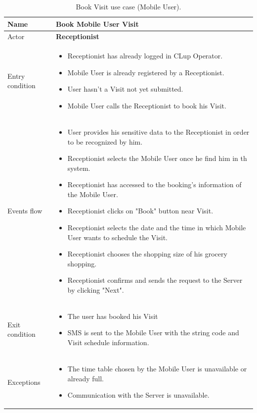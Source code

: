 \begin{table}[H]\begin{tabular}{|p{5cm} | p{7cm} | }
	\hline
	Name & \textbf{Book Mobile User Visit}  \\
	\hline
	Actor & \textbf{Receptionist} \\
	\hline
	Entry condition &
	\begin{itemize}
		\item Receptionist has already logged in CLup Operator. 
 		\item Mobile User is already registered by a Receptionist.
		\item User hasn't a Visit not yet submitted. 
        \item Mobile User calls the Receptionist to book his Visit.
	\end{itemize} \\
	\hline
	Events flow & 
	\begin{itemize}
		\item User provides his sensitive data to the Receptionist in order to be recognized by him. 
        \item Receptionist selects the Mobile User once he find him in th system.
		\item Receptionist has accessed to the booking's information of the Mobile User.
        \item Receptionist clicks on "Book" button near Visit.
		\item Receptionist selects the date and the time in which Mobile User wants to schedule the Visit.
		\item Receptionist chooses the shopping size of his grocery shopping.
		\item Receptionist confirms and sends the request to the Server by clicking "Next".
	\end{itemize} \\
	\hline
	Exit condition & \begin{itemize}
	\item The user has booked his Visit
    \item SMS is sent to the Mobile User with the string code and Visit schedule information. 
    \end{itemize}\\
	\hline 
	Exceptions & 
	\begin{itemize}
    \item The time table chosen by the Mobile User is unavailable or already full.
    \item Communication with the Server is unavailable.
    \end{itemize} \\
	\hline
\end{tabular}
\caption{Book Visit use case (Mobile User).}
\end{table}
\bigbreak

